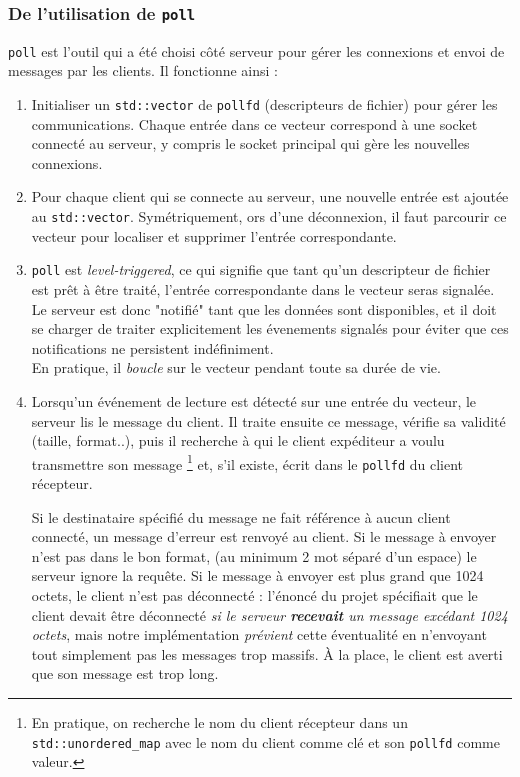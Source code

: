\documentclass{article}
\begin{document}
\subsubsection{De l'utilisation de \texttt{poll}}
\noindent \texttt{poll} \cite{poll} est l'outil qui a été choisi côté serveur pour gérer les connexions et envoi de messages par les clients. Il fonctionne ainsi \cite{poll} :
\begin{enumerate}
    \item Initialiser un \texttt{std::vector} de \texttt{pollfd} (descripteurs de fichier) pour gérer les communications. Chaque entrée dans ce vecteur correspond à une socket connecté au serveur, y compris le socket principal qui gère les nouvelles connexions.
    \item Pour chaque client qui se connecte au serveur, une nouvelle entrée  est ajoutée au \texttt{std::vector}. Symétriquement, ors d'une déconnexion, il faut parcourir ce vecteur pour localiser et supprimer l'entrée correspondante.
    \item \texttt{poll} est \textit{level-triggered}, ce qui signifie que tant qu'un descripteur de fichier est prêt à être traité, l'entrée correspondante dans le vecteur seras signalée. Le serveur est donc "notifié" tant que les données sont disponibles, \cite{LevelEdgeTrigger} \cite{PollTrigger} et il doit se charger de traiter explicitement les évenements signalés pour éviter que ces notifications ne persistent indéfiniment.\\ En pratique, il \textit{boucle} sur le vecteur pendant toute sa durée de vie.
    \item Lorsqu’un événement de lecture est détecté sur une entrée du vecteur, le serveur lis le message du client. Il traite ensuite ce message, vérifie sa validité (taille, format..), puis il recherche à qui le client expéditeur a voulu transmettre son message \footnote{En pratique, on recherche le nom du client récepteur dans un \texttt{std::unordered\_map} avec le nom du client comme clé et son \texttt{pollfd} comme valeur.} et, s'il existe, écrit dans le \texttt{pollfd} du client récepteur.


    Si le destinataire spécifié du message ne fait référence à aucun client connecté, un message d'erreur est renvoyé au client.
    Si le message à envoyer n'est pas dans le bon format, (au minimum 2 mot séparé d'un espace) le serveur ignore la requête.
    Si le message à envoyer est plus grand que 1024 octets, le client n'est pas déconnecté : l'énoncé du projet spécifiait que le client devait être déconnecté \textit{si le serveur \textbf{recevait} un message excédant 1024 octets}, mais notre implémentation \textit{prévient} cette éventualité en n'envoyant tout simplement pas les messages trop massifs. À la place, le client est averti que son message est trop long.
\end{enumerate}
\end{document}
